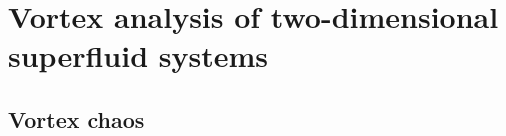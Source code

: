 
\chapter{Vortex analysis of two-dimensional superfluid systems} \label{ch-2d}

\section{Vortex chaos}
